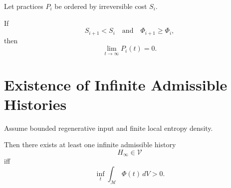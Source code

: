 \documentclass[12pt,oneside]{book}
\begin{document}
Let practices \(P_i\) be ordered by irreversible cost \(S_i\).

If
\begin{equation}
S_{i+1} < S_i
\quad \text{and} \quad
\Phi_{i+1} \ge \Phi_i,
\end{equation}
then
\begin{equation}
\lim_{t\to\infty} P_i(t) = 0.
\end{equation}

\chapter{Existence of Infinite Admissible Histories}

Assume bounded regenerative input and finite local entropy density.

Then there exists at least one infinite admissible history
\[
H_\infty \in \mathcal{V}
\]
iff
\begin{equation}
\inf_t \int_{\mathcal{M}} \Phi(t)\, dV > 0.
\end{equation}
\end{document}
